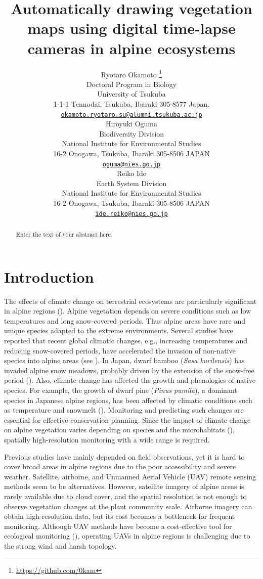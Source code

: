 \documentclass{article}
\title{Automatically drawing vegetation maps using digital time-lapse cameras in alpine ecosystems}
\author{
    Ryotaro Okamoto
    \thanks{\url{https://github.com/0kam}}
   \\
    Doctoral Program in Biology \\
    University of Tsukuba \\
  1-1-1 Tennodai, Tsukuba, Ibaraki 305-8577 Japan. \\
  \texttt{\href{mailto:okamoto.ryotaro.su@alumni.tsukuba.ac.jp}{\nolinkurl{okamoto.ryotaro.su@alumni.tsukuba.ac.jp}}} \\
   \And
    Hiroyuki Oguma
   \\
    Biodiversity Division \\
    National Institute for Environmental Studies \\
  16-2 Onogawa, Tsukuba, Ibaraki 305-8506 JAPAN \\
  \texttt{\href{mailto:oguma@nies.go.jp}{\nolinkurl{oguma@nies.go.jp}}} \\
   \And
    Reiko Ide
   \\
    Earth System Division \\
    National Institute for Environmental Studies \\
  16-2 Onogawa, Tsukuba, Ibaraki 305-8506 JAPAN \\
  \texttt{\href{mailto:ide.reiko@nies.go.jp}{\nolinkurl{ide.reiko@nies.go.jp}}} \\
  }
\begin{document}
\maketitle


\begin{abstract}
Enter the text of your abstract here.
\end{abstract}


\hypertarget{introduction}{%
\section{Introduction}\label{introduction}}

The effects of climate change on terrestrial ecosystems are particularly significant in alpine regions (\cite{IPCC2007}). Alpine vegetation depends on severe conditions such as low temperatures and long snow-covered periods. Thus alpine areas have rare and unique species adapted to the extreme environments. Several studies have reported that recent global climatic changes, e.g., increasing temperatures and reducing snow-covered periods, have accelerated the invasion of non-native species into alpine areas (see \cite{Alexander2016AlpBotany}). In Japan, dwarf bamboo (\emph{Sasa kurilensis}) has invaded alpine snow meadows, probably driven by the extension of the snow-free period (\cite{Kudo2011EcoEvo}). Also, climate change has affected the growth and phenologies of native species. For example, the growth of dwarf pine (\emph{Pinus pumila}), a dominant species in Japanese alpine regions, has been affected by climatic conditions such as temperature and snowmelt (\cite{Amagai2015EcoRes}). Monitoring and predicting such changes are essential for effective conservation planning. Since the impact of climate change on alpine vegetation varies depending on species and the microhabitats (\cite{Kudo2010AAA}), spatially high-resolution monitoring with a wide range is required.

Previous studies have mainly depended on field observations, yet it is hard to cover broad areas in alpine regions due to the poor accessibility and severe weather. Satellite, airborne, and Unmanned Aerial Vehicle (UAV) remote sensing methods seem to be alternatives. However, satellite imagery of alpine areas is rarely available due to cloud cover, and the spatial resolution is not enough to observe vegetation changes at the plant community scale. Airborne imagery can obtain high-resolution data, but its cost becomes a bottleneck for frequent monitoring. Although UAV methods have become a cost-effective tool for ecological monitoring (\cite{Baena2017PLOSONE}), operating UAVs in alpine regions is challenging due to the strong wind and harsh topology.
\end{document}
